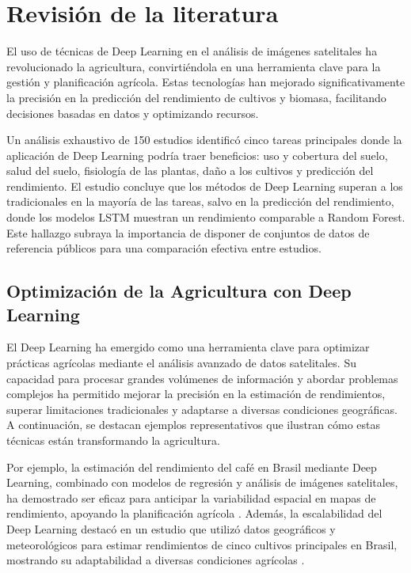 \section{Revisión de la literatura}

El uso de técnicas de Deep Learning en el análisis de imágenes satelitales ha revolucionado la agricultura, convirtiéndola en una herramienta clave para la gestión y planificación agrícola. Estas tecnologías han mejorado significativamente la precisión en la predicción del rendimiento de cultivos y biomasa, facilitando decisiones basadas en datos y optimizando recursos.

Un análisis exhaustivo de 150 estudios \cite{victor2022} identificó cinco tareas principales donde la aplicación de Deep Learning podría traer beneficios: uso y cobertura del suelo, salud del suelo, fisiología de las plantas, daño a los cultivos y predicción del rendimiento. El estudio concluye que los métodos de Deep Learning superan a los tradicionales en la mayoría de las tareas, salvo en la predicción del rendimiento, donde los modelos LSTM muestran un rendimiento comparable a Random Forest. Este hallazgo subraya la importancia de disponer de conjuntos de datos de referencia públicos para una comparación efectiva entre estudios.

\subsection{Optimización de la Agricultura con Deep Learning}
El Deep Learning ha emergido como una herramienta clave para optimizar prácticas agrícolas mediante el análisis avanzado de datos satelitales. Su capacidad para procesar grandes volúmenes de información y abordar problemas complejos ha permitido mejorar la precisión en la estimación de rendimientos, superar limitaciones tradicionales y adaptarse a diversas condiciones geográficas. A continuación, se destacan ejemplos representativos que ilustran cómo estas técnicas están transformando la agricultura.

Por ejemplo, la estimación del rendimiento del café en Brasil mediante Deep Learning, combinado con modelos de regresión y análisis de imágenes satelitales, ha demostrado ser eficaz para anticipar la variabilidad espacial en mapas de rendimiento, apoyando la planificación agrícola \cite{martello2022}. Además, la escalabilidad del Deep Learning destacó en un estudio que utilizó datos geográficos y meteorológicos para estimar rendimientos de cinco cultivos principales en Brasil, mostrando su adaptabilidad a diversas condiciones agrícolas \cite{cunha2020}.

